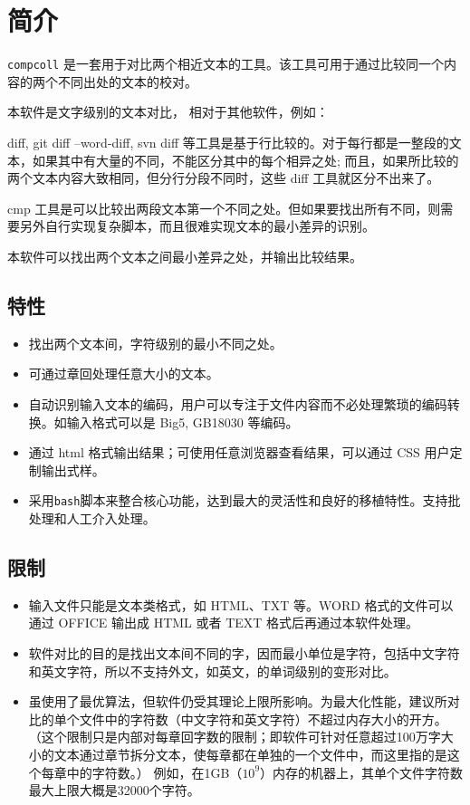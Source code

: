 \documentclass{article}
\title{\doctitle}
\author{\docauthor}
\date{}
\begin{document}
\maketitle



\section{简介}


\texttt{compcoll} 是一套用于对比两个相近文本的工具。该工具可用于通过比较同一个内容的两个不同出处的文本的校对。

本软件是文字级别的文本对比，
相对于其他软件，例如：

diff, git diff --word-diff, svn diff 等工具是基于行比较的。对于每行都是一整段的文本，如果其中有大量的不同，不能区分其中的每个相异之处;
而且，如果所比较的两个文本内容大致相同，但分行分段不同时，这些 diff 工具就区分不出来了。

cmp 工具是可以比较出两段文本第一个不同之处。但如果要找出所有不同，则需要另外自行实现复杂脚本，而且很难实现文本的最小差异的识别。

本软件可以找出两个文本之间最小差异之处，并输出比较结果。


\subsection{特性}

\begin{itemize}
  \item 找出两个文本间，字符级别的最小不同之处。
  \item 可通过章回处理任意大小的文本。
  \item 自动识别输入文本的编码，用户可以专注于文件内容而不必处理繁琐的编码转换。如输入格式可以是 Big5, GB18030 等编码。
  \item 通过 html 格式输出结果；可使用任意浏览器查看结果，可以通过 CSS 用户定制输出式样。
  \item 采用\texttt{bash}脚本来整合核心功能，达到最大的灵活性和良好的移植特性。支持批处理和人工介入处理。
\end{itemize}


\subsection{限制}

\begin{itemize}
  \item 输入文件只能是文本类格式，如 HTML、TXT 等。WORD 格式的文件可以通过 OFFICE 输出成 HTML 或者 TEXT 格式后再通过本软件处理。
  \item 软件对比的目的是找出文本间不同的字，因而最小单位是字符，包括中文字符和英文字符，所以不支持外文，如英文，的单词级别的变形对比。
  \item 虽使用了最优算法，但软件仍受其理论上限所影响。为最大化性能，建议所对比的单个文件中的字符数（中文字符和英文字符）不超过内存大小的开方。（这个限制只是内部对每章回字数的限制；即软件可针对任意超过100万字大小的文本通过章节拆分文本，使每章都在单独的一个文件中，而这里指的是这个每章中的字符数。）
例如，在1GB（$10^9$）内存的机器上，其单个文件字符数最大上限大概是32000个字符。
\end{itemize}
\end{document}
